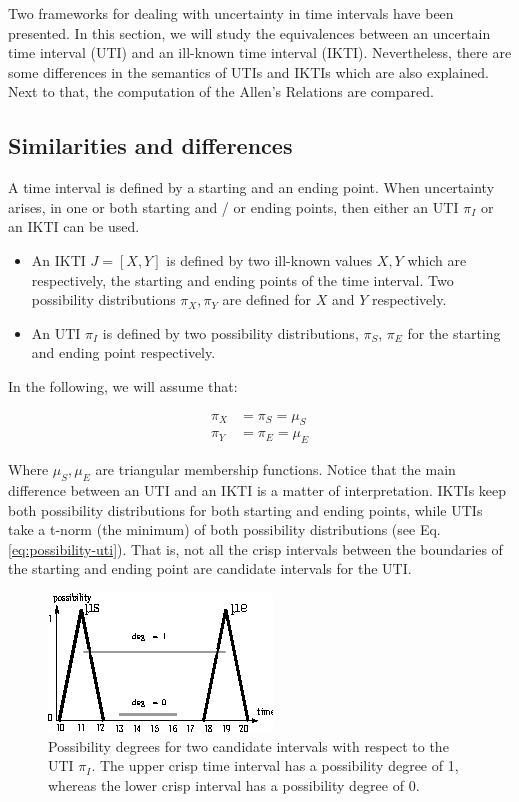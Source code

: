 Two frameworks for dealing with uncertainty in time intervals have been presented. In this section, we will study the equivalences between an uncertain time interval (UTI) and an ill-known time interval (IKTI). Nevertheless, there are some differences in the semantics of UTIs and IKTIs which are also explained. Next to that, the computation of the Allen's Relations are compared.

\subsection{\label{subsec:sim-dif}Similarities and differences}
A time interval is defined by a starting and an ending point. When uncertainty arises, in one or both starting and / or ending points, then either an UTI $\pi_I$ or an IKTI can be used. 

\begin{itemize}
 \item An IKTI $J = \left[X, Y \right]$ is defined by two ill-known values $X, Y$ which are respectively, the starting and ending points of the time interval. Two possibility distributions $\pi_X, \pi_Y$ are defined for $X$ and $Y$ respectively.
\item An UTI $\pi_I$ is defined by two possibility distributions, $\pi_S$, $\pi_E$ for the starting  and ending point respectively.
\end{itemize}

In the following, we will assume that:

\begin{align}
\pi_X &= \pi_S = \mu_S \\
\pi_Y &= \pi_E = \mu_E
\end{align}

Where $\mu_S, \mu_E$ are triangular membership functions. Notice that the main difference between an UTI and an IKTI is a matter of interpretation. IKTIs  keep both possibility distributions for both starting and ending points, while UTIs take a t-norm (the minimum) of both possibility distributions (see Eq. \eqref{eq:possibility-uti}). That is, not all the crisp intervals between the boundaries of the starting and ending point are candidate intervals for the UTI.

\begin{figure}[h]
   \centering
   \includegraphics[scale=1.5]{graphs/equivalences.eps}
   \caption{Possibility degrees for two candidate intervals with respect to the UTI $\pi_I$. The upper crisp time interval has a possibility degree of 1, whereas the lower crisp interval has a possibility degree of 0. }
   \label{fig:ikc-greater}
 \end{figure}

